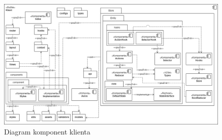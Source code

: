 \begin{landscape}
    \begin{figure}[htbp]
    \centering
        \includegraphics[scale=.6]{obrazky-figures/design/client_component_diagram.png}
        \caption{Diagram komponent klienta}
    \end{figure}
\end{landscape}

